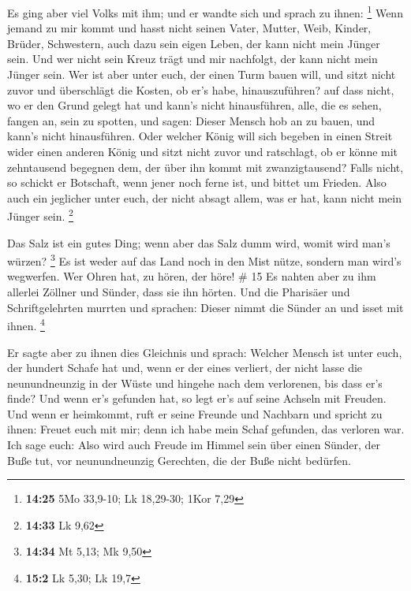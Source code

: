  Es ging aber viel Volks mit ihm; und er wandte sich und
sprach zu ihnen: \footnote{\textbf{14:25} 5Mo 33,9-10; Lk 18,29-30; 1Kor
  7,29}  Wenn jemand zu mir kommt und hasst nicht seinen
Vater, Mutter, Weib, Kinder, Brüder, Schwestern, auch dazu sein eigen
Leben, der kann nicht mein Jünger sein.  Und wer nicht
sein Kreuz trägt und mir nachfolgt, der kann nicht mein Jünger sein.
 Wer ist aber unter euch, der einen Turm bauen will, und
sitzt nicht zuvor und überschlägt die Kosten, ob er's habe,
hinauszuführen?  auf dass nicht, wo er den Grund gelegt
hat und kann's nicht hinausführen, alle, die es sehen, fangen an, sein
zu spotten,  und sagen: Dieser Mensch hob an zu bauen,
und kann's nicht hinausführen.  Oder welcher König will
sich begeben in einen Streit wider einen anderen König und sitzt nicht
zuvor und ratschlagt, ob er könne mit zehntausend begegnen dem, der über
ihn kommt mit zwanzigtausend?  Falls nicht, so schickt er
Botschaft, wenn jener noch ferne ist, und bittet um Frieden.
 Also auch ein jeglicher unter euch, der nicht absagt
allem, was er hat, kann nicht mein Jünger sein. \footnote{\textbf{14:33}
  Lk 9,62}

 Das Salz ist ein gutes Ding; wenn aber das Salz dumm
wird, womit wird man's würzen? \footnote{\textbf{14:34} Mt 5,13; Mk 9,50}
 Es ist weder auf das Land noch in den Mist nütze,
sondern man wird's wegwerfen. Wer Ohren hat, zu hören, der höre! \# 15
 Es nahten aber zu ihm allerlei Zöllner und Sünder, dass
sie ihn hörten.  Und die Pharisäer und Schriftgelehrten
murrten und sprachen: Dieser nimmt die Sünder an und isset mit ihnen.
\footnote{\textbf{15:2} Lk 5,30; Lk 19,7}

 Er sagte aber zu ihnen dies Gleichnis und sprach:
 Welcher Mensch ist unter euch, der hundert Schafe hat
und, wenn er der eines verliert, der nicht lasse die neunundneunzig in
der Wüste und hingehe nach dem verlorenen, bis dass er's finde?
 Und wenn er's gefunden hat, so legt er's auf seine
Achseln mit Freuden.  Und wenn er heimkommt, ruft er seine
Freunde und Nachbarn und spricht zu ihnen: Freuet euch mit mir; denn ich
habe mein Schaf gefunden, das verloren war.  Ich sage
euch: Also wird auch Freude im Himmel sein über einen Sünder, der Buße
tut, vor neunundneunzig Gerechten, die der Buße nicht bedürfen.

